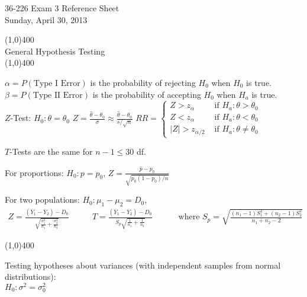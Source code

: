 \documentclass[11pt]{article}
\newcommand{\mydate}{Sunday, April 30, 2013}
\newcommand{\ol}{\overline}
\begin{document}
\thispagestyle{plain}

\begin{center}
{\Large 36-226 Exam 3 Reference Sheet} \\
\mydate
\end{center}







\begin{center}
\line(1,0){400}\\
{\large General Hypothesis Testing}\\
\vspace{-0.1in}
\line(1,0){400}
\end{center}
$\alpha = P(\mbox{Type I Error})$ is the probability of rejecting $H_0$ when
$H_0$ is true.  \\
$\beta = P(\mbox{Type II Error})$ is the probability of accepting $H_0$ when
$H_a$ is true.   \\

$Z$-Test:
$H_0 : \theta = \theta_0$ \quad
$Z = \frac{\hat\theta - \theta_0}{\sigma}
   \approx \frac{\hat\theta - \theta_0}{s/\sqrt n}$
\quad
$RR = \left\{
\begin{array}{cl}
Z > z_\alpha            & \mbox{ if } H_a : \theta > \theta_0    \\
Z < z_\alpha            & \mbox{ if } H_a : \theta < \theta_0    \\
|Z| > z_{\alpha/2}   & \mbox{ if } H_a : \theta \neq \theta_0
\end{array}
    \right.$

$T$-Tests are the same for $n - 1 \leq 30$ df.

For proportions: $H_0 : p = p_0$,
$\displaystyle Z = \frac{\hat p - p_0}{\sqrt{p_0(1 - p_0)/n}}$

For two populations: $H_0: \mu_1 - \mu_2 = D_0$,
\begin{align*}
\displaystyle Z = \frac{(\ol Y_1 - \ol Y_2) - D_0}
                    {\sqrt{\frac{\sigma_1^2}{n_1} + \frac{\sigma_2^2}{n_2}}}
\quad \quad &
\displaystyle T = \frac{(\ol Y_1 - \ol Y_2) - D_0}
                    {S_p\sqrt{\frac{1}{n_1} + \frac{1}{n_2}}}
\quad \quad & \mbox{ where }
S_p = \sqrt{\frac{(n_1 - 1)S_1^2 + (n_2 - 1)S_2^2}{n_1 + n_2 - 2}}
\end{align*}
\begin{center}
\line(1,0){400}\\
\end{center}
Testing hypotheses about variances (with independent samples from normal
distributions):\\
$H_0 : \sigma^2 = \sigma_0^2$
\end{document}
